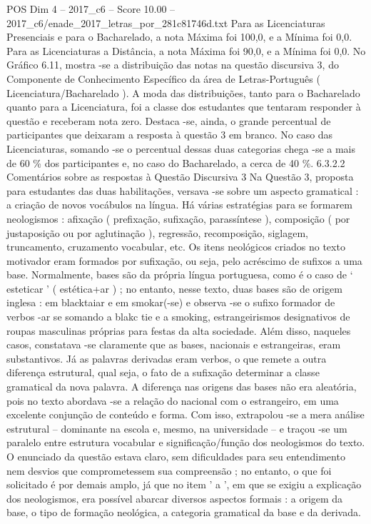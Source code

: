 \begin{textsample}{POS Dim 4 – 2017\_c6 – Score 10.00 – 2017\_c6/enade\_2017\_letras\_por\_281c81746d.txt}
Para as Licenciaturas Presenciais e para o Bacharelado, a nota Máxima foi 100,0, e a Mínima foi 0,0.
Para as Licenciaturas a Distância, a nota Máxima foi 90,0, e a Mínima foi 0,0.
No Gráfico 6.11, mostra -se a distribuição das notas na questão discursiva 3, do Componente de Conhecimento Específico da área de Letras-Português ( Licenciatura/Bacharelado ).
A moda das distribuições, tanto para o Bacharelado quanto para a Licenciatura, foi a classe dos estudantes que tentaram responder à questão e receberam nota zero.
Destaca -se, ainda, o grande percentual de participantes que deixaram a resposta à questão 3 em branco.
No caso das Licenciaturas, somando -se o percentual dessas duas categorias chega -se a mais de 60 \% dos participantes e, no caso do Bacharelado, a cerca de 40 \%. 6.3.2.2 Comentários sobre as respostas à Questão Discursiva 3 Na Questão 3, proposta para estudantes das duas habilitações, versava -se sobre um aspecto gramatical : a criação de novos vocábulos na língua.
Há várias estratégias para se formarem neologismos : afixação ( prefixação, sufixação, parassíntese ), composição ( por justaposição ou por aglutinação ), regressão, recomposição, siglagem, truncamento, cruzamento vocabular, etc.
Os itens neológicos criados no texto motivador eram formados por sufixação, ou seja, pelo acréscimo de sufixos a uma base.
Normalmente, bases são da própria língua portuguesa, como é o caso de ‘ esteticar ’ ( estética+ar ) ; no entanto, nesse texto, duas bases são de origem inglesa : em blacktaiar e em smokar(-se) e observa -se o sufixo formador de verbos -ar se somando a blakc tie e a smoking, estrangeirismos designativos de roupas masculinas próprias para festas da alta sociedade.
Além disso, naqueles casos, constatava -se claramente que as bases, nacionais e estrangeiras, eram substantivos.
Já as palavras derivadas eram verbos, o que remete a outra diferença estrutural, qual seja, o fato de a sufixação determinar a classe gramatical da nova palavra.
A diferença nas origens das bases não era aleatória, pois no texto abordava -se a relação do nacional com o estrangeiro, em uma excelente conjunção de conteúdo e forma.
Com isso, extrapolou -se a mera análise estrutural – dominante na escola e, mesmo, na universidade – e traçou -se um paralelo entre estrutura vocabular e significação/função dos neologismos do texto.
O enunciado da questão estava claro, sem dificuldades para seu entendimento nem desvios que comprometessem sua compreensão ; no entanto, o que foi solicitado é por demais amplo, já que no item ' a ', em que se exigiu a explicação dos neologismos, era possível abarcar diversos aspectos formais : a origem da base, o tipo de formação neológica, a categoria gramatical da base e da derivada.

\end{textsample}
